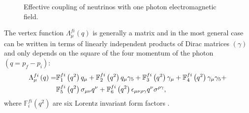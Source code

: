 \begin{figure}
\centering
{}
\caption{Effective coupling of neutrinos with one photon electromagnetic field.}
\label{fig:Feynman}
\end{figure}

\iffalse
The amplitude of neutrino-to-neutrino interaction for \textbf{Dirac} neutrinos is
\begin{equation}
\braket{\nu_f\left(p_f\right)|j^{\left(\nu\right)}_{\mu}\left(x\right)|\nu_i\left(p_i\right)}=
e^{i\left(p_f-p_i\right)x}\overline{u}_f\left(p_f\right)\Lambda^{fi}_{\mu}\left(p_f,p_i\right)u_i\left(p_i\right),
\end{equation}
where $p_f$ and $p_i$ are the final and initial four momentums respectively and $u/\overline{u}$ are the solutions to the Dirac equation for a free particle. We take into account possible transitions between different mass states $\nu_i$ and $\nu_f$ \cite{nuElmagInt2015.pdf}. \todo{also describe what is j}
\fi

The vertex function $\Lambda^{fi}_{\mu}\left(q\right)$ is generally a matrix and in the most general case can be written in terms of linearly independent products of Dirac matrices $\left(\gamma\right)$ and only depends on the square of the four momentum of the photon $\left(q=p_f-p_i\right)$:
\begin{align}
\Lambda^{fi}_{\mu}\left(q\right)=&
\mathbb{F}^{fi}_1\left(q^2\right)q_{\mu}+
\mathbb{F}^{fi}_2\left(q^2\right)q_{\mu}\gamma_5+
\mathbb{F}^{fi}_3\left(q^2\right)\gamma_{\mu}+
\mathbb{F}^{fi}_4\left(q^2\right)\gamma_{\mu}\gamma_5+\notag\\ &
\mathbb{F}^{fi}_5\left(q^2\right)\sigma_{\mu\nu}q^{\nu}+
\mathbb{F}^{fi}_6\left(q^2\right)\epsilon_{\mu\nu\rho\gamma}q^{\nu}\sigma^{\rho\gamma},
\end{align}
where $\mathbb{F}^{fi}_i\left(q^2\right)$ are six Lorentz invariant form factors \cite{nuElmagInt2015.pdf}.

